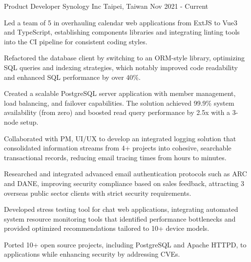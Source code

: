 \begin{cventries}
  \cventry
    {Product Developer} %
    {Synology Inc} %
    {Taipei, Taiwan} %
    {Nov 2021 - Current} %
    {
      \begin{cvitems} %
        \item {Led a team of 5 in overhauling calendar web applications from ExtJS to Vue3 and TypeScript, establishing components libraries and integrating linting tools into the CI pipeline for consistent coding styles.}
        \item {Refactored the database client by switching to an ORM-style library, optimizing SQL queries and indexing strategies, which notably improved code readability and enhanced SQL performance by over 40\%.}
        \item {Created a scalable PostgreSQL server application with member management, load balancing, and failover capabilities. The solution achieved 99.9\% system availability (from zero) and boosted read query performance by 2.5x with a 3-node setup.}
        \item {Collaborated with PM, UI/UX to develop an integrated logging solution that consolidated information streams from 4+ projects into cohesive, searchable transactional records, reducing email tracing times from hours to minutes.}
        \item{Researched and integrated advanced email authentication protocols such as ARC and DANE, improving security compliance based on sales feedback, attracting 3 overseas public sector clients with strict security requirements.}
        \item {Developed stress testing tool for chat web applications, integrating automated system resource monitoring tools that identified performance bottlenecks and provided optimized recommendations tailored to 10+ device models.}
        \item {Ported 10+ open source projects, including PostgreSQL and Apache HTTPD, to applications while enhancing security by addressing CVEs.}
      \end{cvitems}
    }
\end{cventries}
